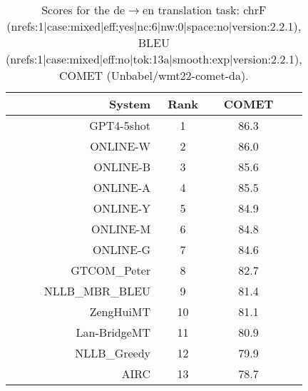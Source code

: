 \documentclass[11pt]{article}
\begin{document}
\begin{table}
\begin{subtable}[t]{0.33\textwidth}
\begin{tabular}{rccc}
\toprule 
System & Rank & COMET \\ 
\midrule 
GPT4-5shot & 1 & 86.3 \\ 
ONLINE-W & 2 & 86.0 \\ 
ONLINE-B & 3 & 85.6 \\ 
ONLINE-A & 4 & 85.5 \\ 
ONLINE-Y & 5 & 84.9 \\ 
ONLINE-M & 6 & 84.8 \\ 
ONLINE-G & 7 & 84.6 \\ 
GTCOM\_Peter & 8 & 82.7 \\ 
NLLB\_MBR\_BLEU & 9 & 81.4 \\ 
ZengHuiMT & 10 & 81.1 \\ 
Lan-BridgeMT & 11 & 80.9 \\ 
NLLB\_Greedy & 12 & 79.9 \\ 
AIRC & 13 & 78.7 \\ 
\bottomrule 
\end{tabular} 
\end{subtable} 
\caption{Scores for the de$\rightarrow$en translation task: chrF (nrefs:1|case:mixed|eff:yes|nc:6|nw:0|space:no|version:2.2.1), BLEU (nrefs:1|case:mixed|eff:no|tok:13a|smooth:exp|version:2.2.1), COMET (Unbabel/wmt22-comet-da).} 
\end{table} 
\end{document}
